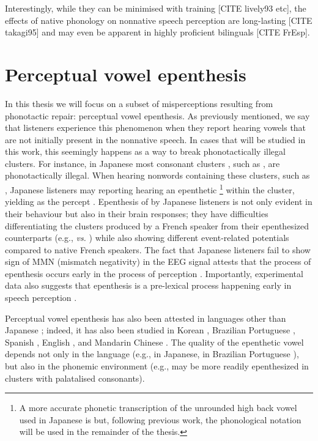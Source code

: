 Interestingly, while they can be minimised with training [CITE lively93 etc], the effects of native phonology on nonnative speech perception are long-lasting [CITE takagi95] and may even be apparent in highly proficient bilinguals [CITE FrEsp].


\section{Perceptual vowel epenthesis}
In this thesis we will focus on a subset of misperceptions resulting from phonotactic repair: perceptual vowel epenthesis. As previously mentioned, we say that listeners experience this phenomenon when they report hearing vowels that are not initially present in the nonnative speech. In cases that will be studied in this work, this seemingly happens as a way to break phonotactically illegal clusters. For instance, in Japanese most consonant clusters%
, such as , are phonotactically illegal. When hearing nonwords containing these clusters, such as , Japanese listeners may reporting hearing an epenthetic \footnote{A more accurate phonetic transcription of the unrounded high back vowel used in Japanese is \textipa{[W]} but, following previous work, the phonological notation  will be used in the remainder of the thesis.} within the cluster, yielding  as the percept \cite{dupoux1999}. Epenthesis of  by Japanese listeners is not only evident in their behaviour but also in their brain responses; they have difficulties differentiating the clusters produced by a French speaker from their epenthesized counterparts (e.g.,  \textit{vs.} ) while also showing different event-related potentials compared to native French speakers. The fact that Japanese listeners fail to show sign of MMN (mismatch negativity) in the EEG signal attests that the process of epenthesis occurs early in the process of perception \cite{dehaene2000}. Importantly, experimental data also suggests that epenthesis is a pre-lexical process happening early in speech perception \cite{dupoux2001}.

Perceptual vowel epenthesis has also been attested in languages other than Japanese \cite{dupoux1999, dehaene2000, dupoux2001, monahan2009, dupoux2011, mattingley2015}; indeed, it has also been studied in Korean \cite{kabak2007, shin2011, dejong2012, durvasula2015, durvasula2016}, Brazilian Portuguese \cite{dupoux2011}, Spanish \cite{halle2014}, English \cite{berent2007, zhao2018}, and Mandarin Chinese \cite{durvasula2018}. The quality of the epenthetic vowel depends not only in the language (e.g., \textipa{[W]} in Japanese, \textipa{[i]} in Brazilian Portuguese \cite{dupoux2011}), but also in the phonemic environment (e.g.,  may be more readily epenthesized in clusters with palatalised consonants). 

